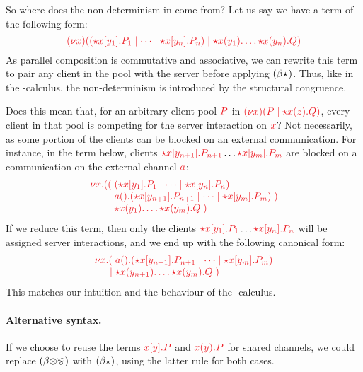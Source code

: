 \documentclass[UKenglish]{llncs}
\begin{document}
So where does the non-determinism in \nodcap come from? Let us say we have a term of the following form:
\[
  \tm{
    \cpCut{x}
    {\ncPool{\ncCnt{x}{y_1}{P_1}}{\dots \mid \ncCnt{x}{y_n}{P_n}}}
    {\ncSrv{x}{y_1}{\dots\ncSrv{x}{y_n}{Q}}}
  }
\]
As parallel composition is commutative and associative, we can rewrite this term to pair any client in the pool with the server before applying $(\beta{\star}_{})$. Thus, like in the \textpi-calculus, the non-determinism is introduced by the structural congruence.

Does this mean that, for an arbitrary client pool $\tm{P}$ in $\tm{\cpCut{x}{P}{\ncSrv{x}{z}{Q}}}$, every client in that pool is competing for the server interaction on $\tm{x}$? Not necessarily, as some portion of the clients can be blocked on an external communication. For instance, in the term below, clients $\tm{\ncCnt{x}{y_{n+1}}{P_{n+1}}} \dots \tm{\ncCnt{x}{y_m}{P_m}}$ are blocked on a communication on the external channel $\tm{a}$:
\[
  \arraycolsep=0pt
  \tm{
  \begin{array}{lrl}
    \nu x.&  ((&\; \ncPool{\ncCnt{x}{y_1}{P_1}}{\dots\mid\ncCnt{x}{y_n}{P_n}}\\
          &\mid&\; \cpWait{a}{\ncPool{\ncCnt{x}{y_{n+1}}{P_{n+1}}}{\dots \mid \ncCnt{x}{y_m}{P_m}}}\;)\\
          &\mid&\; \ncSrv{x}{y_1}{\dots\ncSrv{x}{y_m}{Q}}\;)
  \end{array}}
\]
If we reduce this term, then only the clients $\tm{\ncCnt{x}{y_1}{P_1}} \dots \tm{\ncCnt{x}{y_n}{P_n}}$ will be assigned server interactions, and we end up with the following canonical form:
\[
  \arraycolsep=0pt
  \tm{
  \begin{array}{lrl}
    \nu x.&   (&\; \cpWait{a}{\ncPool{\ncCnt{x}{y_{n+1}}{P_{n+1}}}{\dots\mid\ncCnt{x}{y_m}{P_m}}}\\
          &\mid&\; \ncSrv{x}{y_{n+1}}{\dots\ncSrv{x}{y_m}{Q}}\;)
  \end{array}}
\]
This matches our intuition and the behaviour of the \textpi-calculus.

\paragraph{Alternative syntax.}
If we choose to reuse the terms $\tm{\piSend{x}{y}{P}}$ and $\tm{\piRecv{x}{y}{P}}$ for shared channels, we could replace $(\beta{\ensuremath{\otimes}}{\mathbin{\bindnasrepma}})$ with $(\beta{\star}_{})$, using the latter rule for both cases.
\end{document}
